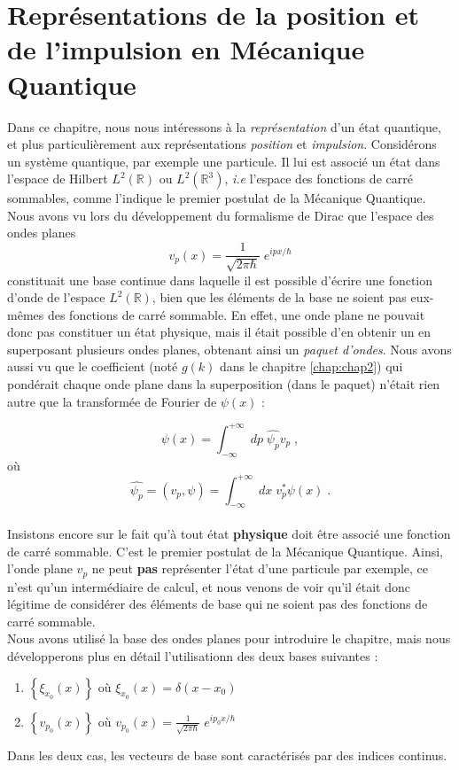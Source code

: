 \documentclass[../notesdecours]{subfiles}
\begin{document}
\chapter{Représentations de la position et de l'impulsion en Mécanique Quantique}\label{chap:chap6}

Dans ce chapitre, nous nous intéressons à la \textit{représentation} d'un état quantique, et plus particulièrement aux représentations \textit{position} et \textit{impulsion}. Considérons un système quantique, par exemple une particule. Il lui est associé un état dans l'espace de Hilbert $L^2(\mathbb{R})$ ou $L^2(\mathbb{R}^3)$, \textit{i.e} l'espace des fonctions de carré sommables, comme l'indique le premier postulat de la Mécanique Quantique. \\

Nous avons vu lors du développement du formalisme de Dirac que l'espace des ondes planes $$v_p(x) = \frac{1}{\sqrt{2 \pi \hbar}} \; e^{ipx/\hbar}$$ constituait une base continue dans laquelle il est possible d'écrire une fonction d'onde de l'espace $L^2(\mathbb{R})$, bien que les éléments de la base ne soient pas eux-mêmes des fonctions de carré sommable. En effet, une onde plane ne pouvait donc pas constituer un état physique, mais il était possible d'en obtenir un en superposant plusieurs ondes planes, obtenant ainsi un \textit{paquet d'ondes}. Nous avons aussi vu que le coefficient (noté $g(k)$ dans le chapitre \ref{chap:chap2}) qui pondérait chaque onde plane dans la superposition (dans le paquet) n'était rien autre que la transformée de Fourier de $\psi(x)$ :

$$ \psi(x) = \int_{-\infty}^{+\infty} \; dp \; \hat{\psi_p} v_p \; , $$ où $$\hat{\psi_p} = (v_p, \psi) = \int_{-\infty}^{+\infty} \; dx \; v_p^* \psi(x)\; .$$ \\


Insistons encore sur le fait qu'à tout état \textbf{physique} doit être associé une fonction de carré sommable. C'est le premier postulat de la Mécanique Quantique. Ainsi, l'onde plane $v_p$ ne peut \textbf{pas} représenter l'état d'une particule par exemple, ce n'est qu'un intermédiaire de calcul, et nous venons de voir qu'il était donc légitime de considérer des éléments de base qui ne soient pas des fonctions de carré sommable. \\

Nous avons utilisé la base des ondes planes pour introduire le chapitre, mais nous développerons plus en détail l'utilisationn des deux bases suivantes :
\begin{enumerate}
    \item $\left\{ \xi_{x_0}(x) \right\}$ où $\xi_{x_0}(x) = \delta(x-x_0)$ 
    \item $\left\{ v_{p_0}(x) \right\}$ où $v_{p_0}(x) = \frac{1}{\sqrt{2\pi \hbar}} \; e^{ip_0 x/\hbar}$
\end{enumerate}
Dans les deux cas, les vecteurs de base sont caractérisés par des indices continus. \\
\end{document}
